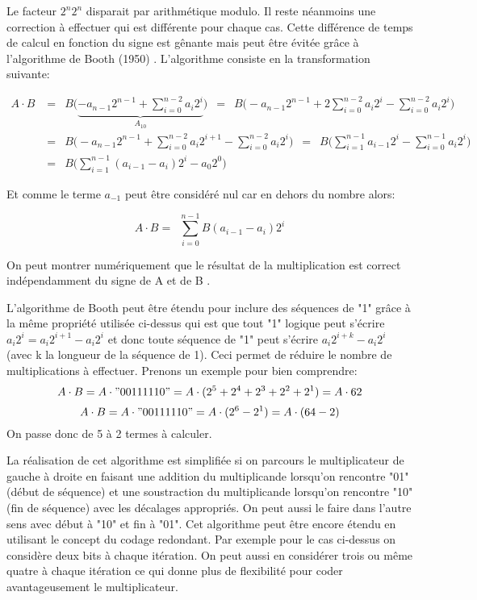 Le facteur $2^{n}2^{n}$ disparait par arithmétique modulo. Il reste néanmoins une correction à effectuer qui est différente pour chaque cas. Cette différence de temps de calcul en fonction du signe est gênante mais peut être évitée grâce à l'algorithme de Booth (1950) \cite{booth}. L'algorithme consiste en la transformation suivante:

\begin{equation}
\begin{aligned}
A \cdot B &= \enspace B \Bigg( \underbrace{ -a_{n-1}2^{n-1} + \sum_{i=0}^{n-2} a_{i}2^{i}}_{A_{10}} \Bigg) \enspace 
= \enspace  B \Bigg( -a_{n-1}2^{n-1} + 2\sum_{i=0}^{n-2} a_{i}2^{i} - \sum_{i=0}^{n-2} a_{i}2^{i} \Bigg) \\ 
&= \enspace B \Bigg( -a_{n-1}2^{n-1} + \sum_{i=0}^{n-2} a_{i}2^{i+1} - \sum_{i=0}^{n-2} a_{i}2^{i} \Bigg) \enspace 
= \enspace B \Bigg( \sum_{i=1}^{n-1} a_{i-1}2^{i} - \sum_{i=0}^{n-1} a_{i}2^{i} \Bigg) \\ 
&= \enspace B \Bigg( \sum_{i=1}^{n-1} (a_{i-1}-a_i)2^{i} - a_{0}2^{0} \Bigg)
\end{aligned}
\end{equation}

Et comme le terme $a_{-1}$ peut être considéré nul car en dehors du nombre alors:

\begin{equation}
A \cdot B = \enspace \sum_{i=0}^{n-1} B(a_{i-1}-a_i)2^{i}
\end{equation}

On peut montrer numériquement que le résultat de la multiplication est correct indépendamment du signe de A et de B \cite{booth}.

L'algorithme de Booth peut être étendu pour inclure des séquences de "1" grâce à la même propriété utilisée ci-dessus qui est que tout "1" logique peut s'écrire $a_i2^i = a_i2^{i+1}-a_i2^i$ et donc toute séquence de "1" peut s'écrire $a_i2^{i+k}-a_i2^i$ (avec k la longueur de la séquence de 1). Ceci permet de réduire le nombre de multiplications à effectuer. Prenons un exemple pour bien comprendre:
\[
A \cdot B = A \cdot "00111110" = A \cdot (2^5 + 2^4 + 2^3 + 2^2 + 2^1) = A \cdot 62
\]
\[
A \cdot B = A \cdot "00111110" = A \cdot (2^6 - 2^1) = A \cdot (64 - 2)
\]
On passe donc de 5 à 2 termes à calculer.

La réalisation de cet algorithme est simplifiée si on parcours le multiplicateur de gauche à droite en faisant une addition du multiplicande lorsqu'on rencontre "01" (début de séquence) et une soustraction du multiplicande lorsqu'on rencontre "10" (fin de séquence) avec les décalages appropriés. On peut aussi le faire dans l'autre sens avec début à "10" et fin à "01".
Cet algorithme peut être encore étendu en utilisant le concept du codage redondant. Par exemple pour le cas ci-dessus on considère deux bits à chaque itération. On peut aussi en considérer trois ou même quatre à chaque itération ce qui donne plus de flexibilité pour coder avantageusement le multiplicateur.

